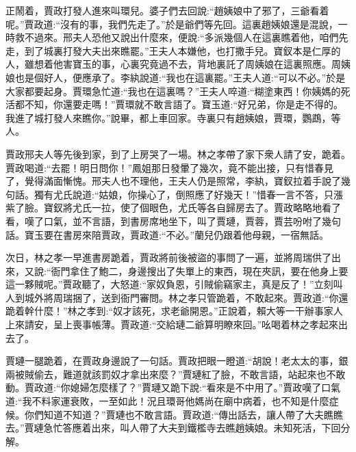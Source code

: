 \begin{parag}
    正鬧着，賈政打發人進來叫環兒。婆子們去回說:“趙姨娘中了邪了，三爺看着呢。”賈政道:“沒有的事，我們先走了。”於是爺們等先回。這裏趙姨娘還是混說，一時救不過來。邢夫人恐他又說出什麼來，便說:“多派幾個人在這裏瞧着他，咱們先走，到了城裏打發大夫出來瞧罷。”王夫人本嫌他，也打撒手兒。寶釵本是仁厚的人，雖想着他害寶玉的事，心裏究竟過不去，背地裏託了周姨娘在這裏照應。周姨娘也是個好人，便應承了。李紈說道:“我也在這裏罷。”王夫人道:“可以不必。”於是大家都要起身。賈環急忙道:“我也在這裏嗎？”王夫人啐道:“糊塗東西！你姨媽的死活都不知，你還要走嗎！”賈環就不敢言語了。寶玉道:“好兄弟，你是走不得的。我進了城打發人來瞧你。”說畢，都上車回家。寺裏只有趙姨娘，賈環，鸚鵡，等人。
\end{parag}


\begin{parag}
    賈政邢夫人等先後到家，到了上房哭了一場。林之孝帶了家下衆人請了安，跪着。賈政喝道:“去罷！明日問你！”鳳姐那日發暈了幾次，竟不能出接，只有惜春見了，覺得滿面慚愧。邢夫人也不理他，王夫人仍是照常，李紈，寶釵拉着手說了幾句話。獨有尤氏說道:“姑娘，你操心了，倒照應了好幾天！”惜春一言不答，只漲紫了臉。寶釵將尤氏一拉，使了個眼色，尤氏等各自歸房去了。賈政略略地看了看，嘆了口氣，並不言語，到書房席地坐下，叫了賈璉，賈蓉，賈芸吩咐了幾句話。寶玉要在書房來陪賈政，賈政道:“不必。”蘭兒仍跟着他母親，一宿無話。
\end{parag}


\begin{parag}
    次日，林之孝一早進書房跪着，賈政將前後被盜的事問了一遍，並將周瑞供了出來，又說:“衙門拿住了鮑二，身邊搜出了失單上的東西，現在夾訊，要在他身上要這一夥賊呢。”賈政聽了，大怒道:“家奴負恩，引賊偷竊家主，真是反了！”立刻叫人到城外將周瑞捆了，送到衙門審問。林之孝只管跪着，不敢起來。賈政道:“你還跪着幹什麼！”林之孝到:“奴才該死，求老爺開恩。”正說着，賴大等一干辦事家人上來請安，呈上喪事帳薄。賈政道:“交給璉二爺算明瞭來回。”吆喝着林之孝起來出去了。
\end{parag}


\begin{parag}
    賈璉一腿跪着，在賈政身邊說了一句話。賈政把眼一瞪道:“胡說！老太太的事，銀兩被賊偷去，難道就該罰奴才拿出來麼？”賈璉紅了臉，不敢言語，站起來也不敢動。賈政道:“你媳婦怎麼樣了？”賈璉又跪下說:“看來是不中用了。”賈政嘆了口氣道:“我不料家運衰敗，一至如此！況且環哥他媽尚在廟中病着，也不知是什麼症候。你們知道不知道？”賈璉也不敢言語。賈政道:“傳出話去，讓人帶了大夫瞧瞧去。”賈璉急忙答應着出來，叫人帶了大夫到鐵檻寺去瞧趙姨娘。未知死活，下回分解。
\end{parag}